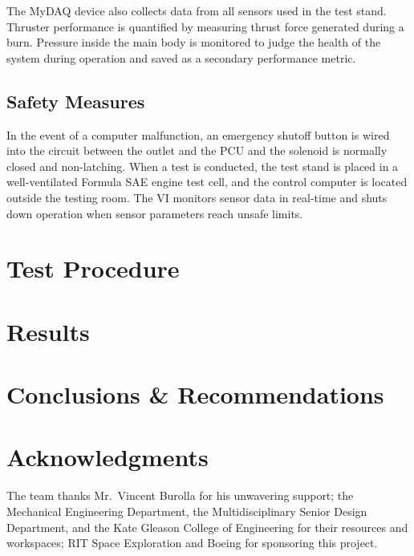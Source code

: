 \documentclass[journal]{IEEEtran}
\begin{document}
The MyDAQ device also collects data from all sensors used in the test stand.
Thruster performance is quantified by measuring thrust force generated during a burn.
Pressure inside the main body is monitored to judge the health of the system during operation and saved as a secondary performance metric.

\subsection{Safety Measures}
In the event of a computer malfunction, an emergency shutoff button is wired into the circuit between the outlet and the PCU and the solenoid is normally closed and non-latching.
When a test is conducted, the test stand is placed in a well-ventilated Formula SAE engine test cell, and the control computer is located outside the testing room.
The VI monitors sensor data in real-time and shuts down operation when sensor parameters reach unsafe limits.


\section{Test Procedure}

\section{Results}

\section{Conclusions \& Recommendations}

\section*{Acknowledgments}
The team thanks Mr.~Vincent Burolla for his unwavering support; the Mechanical Engineering Department, the Multidisciplinary Senior Design Department, and the Kate Gleason College of Engineering for their resources and workspaces; RIT Space Exploration and Boeing for sponsoring this project.



\end{document}
